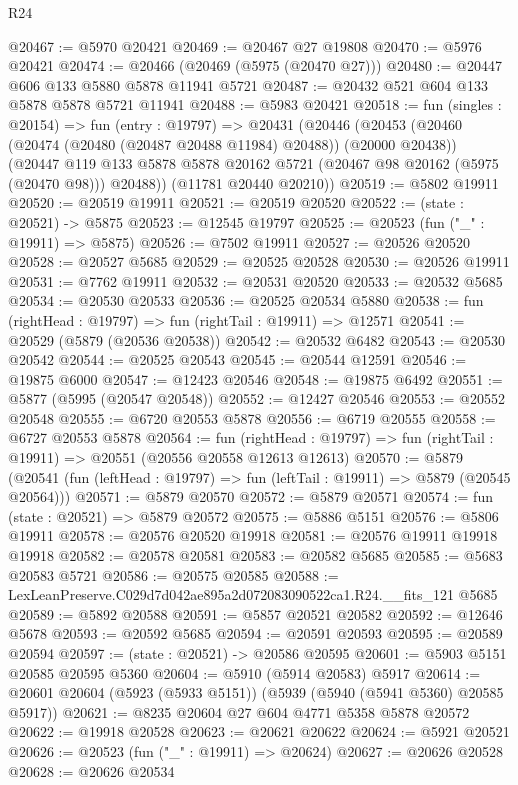 \begin{lexlean}{R24}
\begin{coremodule}
@20467 := @5970 @20421
@20469 := @20467 @27 @19808
@20470 := @5976 @20421
@20474 := @20466 (@20469 (@5975 (@20470 @27)))
@20480 := @20447 @606 @133 @5880 @5878 @11941 @5721
@20487 := @20432 @521 @604 @133 @5878 @5878 @5721 @11941
@20488 := @5983 @20421
@20518 := fun (singles : @20154) =>
  fun (entry : @19797) =>
  @20431
    (@20446
      (@20453
        (@20460 (@20474 (@20480 (@20487 @20488 @11984) @20488)) (@20000 @20438))
        (@20447 @119 @133 @5878 @5878 @20162 @5721 (@20467 @98 @20162 (@5975 (@20470 @98))) @20488))
      (@11781 @20440 @20210))
@20519 := @5802 @19911
@20520 := @20519 @19911
@20521 := @20519 @20520
@20522 := (state : @20521) -> @5875
@20523 := @12545 @19797
@20525 := @20523 (fun ("_" : @19911) => @5875)
@20526 := @7502 @19911
@20527 := @20526 @20520
@20528 := @20527 @5685
@20529 := @20525 @20528
@20530 := @20526 @19911
@20531 := @7762 @19911
@20532 := @20531 @20520
@20533 := @20532 @5685
@20534 := @20530 @20533
@20536 := @20525 @20534 @5880
@20538 := fun (rightHead : @19797) => fun (rightTail : @19911) => @12571
@20541 := @20529 (@5879 (@20536 @20538))
@20542 := @20532 @6482
@20543 := @20530 @20542
@20544 := @20525 @20543
@20545 := @20544 @12591
@20546 := @19875 @6000
@20547 := @12423 @20546
@20548 := @19875 @6492
@20551 := @5877 (@5995 (@20547 @20548))
@20552 := @12427 @20546
@20553 := @20552 @20548
@20555 := @6720 @20553 @5878
@20556 := @6719 @20555
@20558 := @6727 @20553 @5878
@20564 := fun (rightHead : @19797) =>
  fun (rightTail : @19911) => @20551 (@20556 @20558 @12613 @12613)
@20570 := @5879
    (@20541 (fun (leftHead : @19797) => fun (leftTail : @19911) => @5879 (@20545 @20564)))
@20571 := @5879 @20570
@20572 := @5879 @20571
@20574 := fun (state : @20521) => @5879 @20572
@20575 := @5886 @5151
@20576 := @5806 @19911
@20578 := @20576 @20520 @19918
@20581 := @20576 @19911 @19918 @19918
@20582 := @20578 @20581
@20583 := @20582 @5685
@20585 := @5683 @20583 @5721
@20586 := @20575 @20585
@20588 := LexLeanPreserve.C029d7d042ae895a2d072083090522ca1.R24.__fits_121 @5685
@20589 := @5892 @20588
@20591 := @5857 @20521 @20582
@20592 := @12646 @5678
@20593 := @20592 @5685
@20594 := @20591 @20593
@20595 := @20589 @20594
@20597 := (state : @20521) -> @20586 @20595
@20601 := @5903 @5151 @20585 @20595 @5360
@20604 := @5910 (@5914 @20583) @5917
@20614 := @20601 @20604 (@5923 (@5933 @5151)) (@5939 (@5940 (@5941 @5360) @20585 @5917))
@20621 := @8235 @20604 @27 @604 @4771 @5358 @5878 @20572
@20622 := @19918 @20528
@20623 := @20621 @20622
@20624 := @5921 @20521
@20626 := @20523 (fun ("_" : @19911) => @20624)
@20627 := @20626 @20528
@20628 := @20626 @20534

\end{coremodule}
\end{lexlean}
